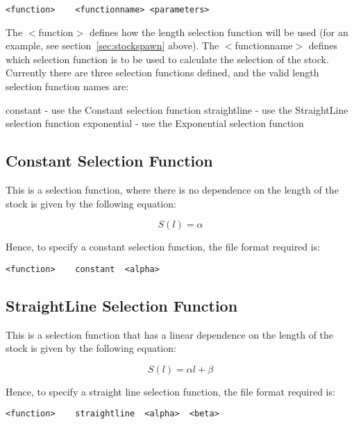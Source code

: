 \documentclass[10pt,twoside]{book}
\begin{document}
{\small\begin{verbatim}
<function>    <functionname> <parameters>
\end{verbatim}}

The $<$function$>$ defines how the length selection function will be used (for an example, see section~\ref{sec:stockspawn} above).  The $<$functionname$>$ defines which selection function is to be used to calculate the selection of the stock.  Currently there are three selection functions defined, and the valid length selection function names are:

\bigskip
constant - use the Constant selection function\newline
straightline - use the StraightLine selection function\newline
exponential - use the Exponential selection function

\subsection{Constant Selection Function}
This is a selection function, where there is no dependence on the length of the stock is given by the following equation:

\begin{equation}\label{eq:constsel}
S(l) = \alpha
\end{equation}

Hence, to specify a constant selection function, the file format required is:

{\small\begin{verbatim}
<function>    constant  <alpha>
\end{verbatim}}

\subsection{StraightLine Selection Function}
This is a selection function that has a linear dependence on the length of the stock is given by the following equation:

\begin{equation}\label{eq:straightsel}
S(l) = \alpha l + \beta
\end{equation}

\bigskip
Hence, to specify a straight line selection function, the file format required is:

{\small\begin{verbatim}
<function>    straightline  <alpha>  <beta>
\end{verbatim}}
\end{document}
